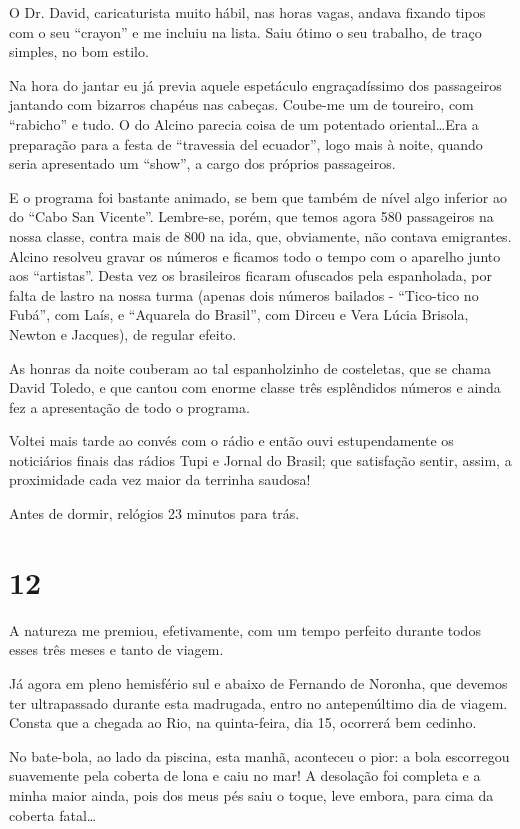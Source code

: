 O Dr. David, caricaturista muito hábil, nas horas vagas, andava fixando tipos com o seu “crayon” e me incluiu na lista. Saiu ótimo o seu trabalho, de traço simples, no bom estilo.

Na hora do jantar eu já previa aquele espetáculo engraçadíssimo dos passageiros jantando com bizarros chapéus nas cabeças. Coube-me um de toureiro, com “rabicho” e tudo. O do Alcino parecia coisa de um potentado oriental\ldots Era a preparação para a festa de “travessia del ecuador”, logo mais à noite, quando seria apresentado um “show”, a cargo dos próprios passageiros.

E o programa foi bastante animado, se bem que também de nível algo inferior ao do “Cabo San Vicente”. Lembre-se, porém, que temos agora 580 passageiros na nossa classe, contra mais de 800 na ida, que, obviamente, não contava emigrantes. Alcino resolveu gravar os números e ficamos todo o tempo com o aparelho junto aos “artistas”. Desta vez os brasileiros ficaram ofuscados pela espanholada, por falta de lastro na nossa turma (apenas dois números bailados - “Tico-tico no Fubá”, com Laís, e “Aquarela do Brasil”, com Dirceu e Vera Lúcia Brisola, Newton e Jacques), de regular efeito.

As honras da noite couberam ao tal espanholzinho de costeletas, que se chama David Toledo, e que cantou com enorme classe três esplêndidos números e ainda fez a apresentação de todo o programa.

Voltei mais tarde ao convés com o rádio e então ouvi estupendamente os noticiários finais das rádios Tupi e Jornal do Brasil; que satisfação sentir, assim, a proximidade cada vez maior da terrinha saudosa!

Antes de dormir, relógios 23 minutos para trás.

\section*{12 \adfflatleafright {}}
A natureza me premiou, efetivamente, com um tempo perfeito durante todos esses três meses e tanto de viagem.

Já agora em pleno hemisfério sul e abaixo de Fernando de Noronha, que devemos ter ultrapassado durante esta madrugada, entro no antepenúltimo dia de viagem. Consta que a chegada ao Rio, na quinta-feira, dia 15, ocorrerá bem cedinho.

No bate-bola, ao lado da piscina, esta manhã, aconteceu o pior: a bola escorregou suavemente pela coberta de lona e caiu no mar! A desolação foi completa e a minha maior ainda, pois dos meus pés saiu o toque, leve embora, para cima da coberta fatal\ldots

